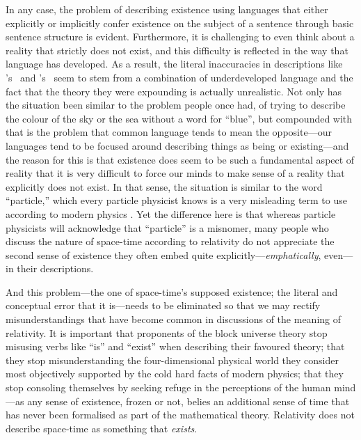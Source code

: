 \documentclass[aps,rmp,groupedaddress,twocolumn,10pt]{revtex4-2}
\begin{document}
In any case, the problem of describing existence using languages that either explicitly or implicitly confer existence on the subject of a sentence through basic sentence structure is evident. Furthermore, it is challenging to even think about a reality that strictly does not exist, and this difficulty is reflected in the way that language has developed. As a result, the literal inaccuracies in descriptions like \citeauthor{Einstein1938}'s~\citeyearpar{Einstein1938} and \citeauthor{Greene2004}'s~\citeyearpar{Greene2004} seem to stem from a combination of underdeveloped language and the fact that the theory they were expounding is actually unrealistic. Not only has the situation been similar to the problem people once had, of trying to describe the colour of the sky or the sea without a word for ``blue'', but compounded with that is the problem that common language tends to mean the opposite---our languages tend to be focused around describing things as being or existing---and the reason for this is that existence does seem to be such a fundamental aspect of reality that it is very difficult to force our minds to make sense of a reality that explicitly does not exist. In that sense, the situation is similar to the word ``particle,'' which every particle physicist knows is a very misleading term to use according to modern physics \cite{strassler2024}. Yet the difference here is that whereas particle physicists will acknowledge that ``particle'' is a misnomer, many people who discuss the nature of space-time according to relativity do not appreciate the second sense of existence they often embed quite explicitly---\textit{emphatically}, even---in their descriptions. 

And this problem---the one of space-time's supposed existence; the literal and conceptual error that it is---needs to be eliminated so that we may rectify misunderstandings that have become common in discussions of the meaning of relativity. It is important that proponents of the block universe theory stop misusing verbs like ``is'' and ``exist'' when describing their favoured theory; that they stop misunderstanding the four-dimensional physical world they consider most objectively supported by the cold hard facts of modern physics; that they stop consoling themselves by seeking refuge in the perceptions of the human mind---as any sense of existence, frozen or not, belies an additional sense of time that has never been formalised as part of the mathematical theory. Relativity does not describe space-time as something that \textit{exists}. 
\end{document}
